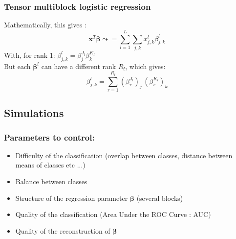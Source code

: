 \documentclass{beamer}
\begin{document}
\begin{frame}
    \frametitle{Tensor multiblock logistic regression}
    Mathematically, this gives :
    $$\mathbf{x}^T\bm{\beta} \leadsto =  \sum\limits_{l = 1}^L \sum\limits_{j,k} x_{j,k}^l\beta_{j,k}^l$$
    With, for rank 1: $\beta_{j,k}^l = \beta_j^{J_l}\beta_k^{K_l}$\\[10 pt]
    But each $\bm{\beta}^l$ can have a different rank $R_l$, which gives:
    $$\beta_{j,k}^l = \sum\limits_{r = 1}^{R_l} (\beta_r^{J_l})_j \, (\beta_r^{K_l})_k $$
\end{frame}

\begin{frame}
    \section{Simulations}    
\end{frame}

\begin{frame}
    \frametitle{Parameters to control:}
    \begin{itemize}
        \item Difficulty of the classification (overlap between classes, distance between means of classes etc ...)\\[12 pt]
        \item Balance between classes\\[12 pt]
        \item Structure of the regression parameter $\bm{\beta}$ (several blocks)\\[12 pt] 
        \item Quality of the classification (Area Under the ROC Curve : AUC)\\[12 pt]
        \item Quality of the reconstruction of $\bm{\beta}$ \nocite{picto}
    \end{itemize}
\end{frame}
\end{document}
